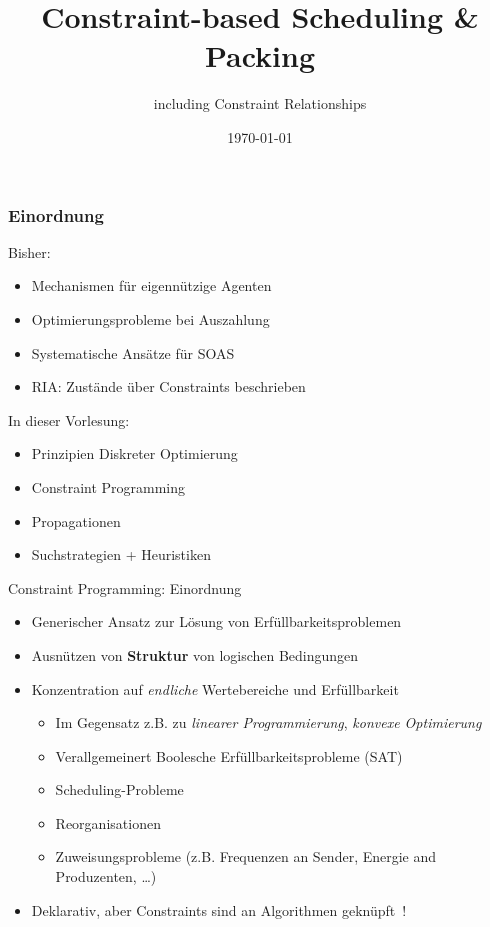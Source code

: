 \documentclass[10pt,xcolor={dvipsnames},fleqn]{beamer}
\title{Constraint-based Scheduling \& Packing}
\author{including Constraint Relationships}
\date{\today}
\begin{document}
\titleframe

\begin{frame}
    \frametitle{Einordnung}
 \alert{Bisher:}
    \begin{itemize}
    \item Mechanismen für eigennützige Agenten
    \item Optimierungsprobleme bei Auszahlung
    \item Systematische Ansätze für SOAS
    \item RIA: Zustände über Constraints beschrieben
    \end{itemize}
\alert{In dieser Vorlesung:}
    \begin{itemize} 
    \item Prinzipien Diskreter Optimierung
    \item Constraint Programming
    \item Propagationen
    \item Suchstrategien + Heuristiken
     \end{itemize}
\end{frame}
\graphicspath{{img/}}

\begin{frame}{Constraint Programming: Einordnung}	
\begin{itemize}
\item Generischer Ansatz zur Lösung von \alert{Erfüllbarkeitsproblemen} 
\item Ausnützen von \textbf{Struktur} von logischen Bedingungen~\cite{tsang1993foundations}
\item Konzentration auf \emph{endliche} Wertebereiche und Erfüllbarkeit~\cite[Kap.~5]{russell2010artificial} \pause
\begin{itemize}
\item Im Gegensatz z.B. zu \emph{linearer Programmierung}, \emph{konvexe Optimierung}
\item Verallgemeinert Boolesche Erfüllbarkeitsprobleme (SAT)
\item Scheduling-Probleme
\item Reorganisationen
\item Zuweisungsprobleme (z.B. Frequenzen an Sender, Energie and Produzenten, \ldots)
\end{itemize} \pause
\item Deklarativ, aber Constraints sind an Algorithmen geknüpft~\cite{Rossi2006}! 
\end{itemize}
\end{frame}
\end{document}
